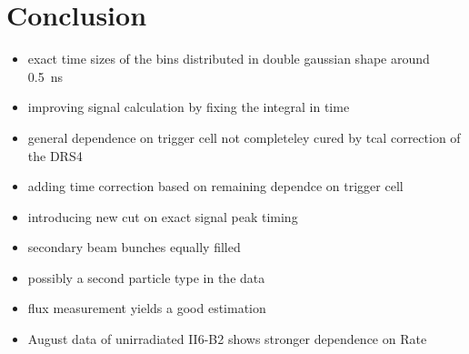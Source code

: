 \documentclass[9pt]{beamer}
\begin{document}
\section{Conclusion}
\begin{frame}
	\begin{itemize}
		\setlength{\itemsep}{\fill}
		\item exact time sizes of the bins distributed in double gaussian shape around \SI{.5}{ns}
		\item improving signal calculation by fixing the integral in time
		\item general dependence on trigger cell not completeley cured by tcal correction of the DRS4
		\item adding time correction based on remaining dependce on trigger cell
		\item introducing new cut on exact signal peak timing 
		\item secondary beam bunches equally filled
		\item possibly a second particle type in the data
		\item flux measurement yields a good estimation
		\item August data of unirradiated II6-B2 shows stronger dependence on Rate
	\end{itemize}
\end{frame}
\end{document}
